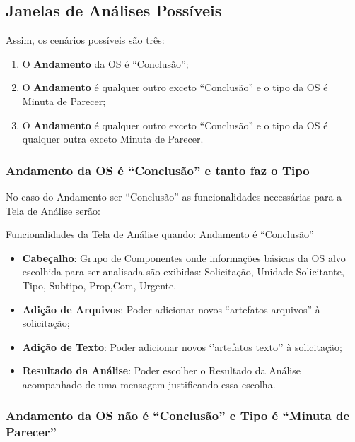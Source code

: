 

\subsection{Janelas de Análises Possíveis}

Assim, os cenários possíveis são três:

\begin{enumerate}
	\item O \textbf{Andamento} da OS é ``Conclusão'';
	\item O \textbf{Andamento} é qualquer outro exceto ``Conclusão'' e o tipo da OS é Minuta de Parecer;	
	\item O \textbf{Andamento} é qualquer outro exceto ``Conclusão'' e o tipo da OS é qualquer outra exceto Minuta de Parecer.		
\end{enumerate}


\subsubsection{Andamento da OS é ``Conclusão'' e tanto faz o Tipo}

No caso do Andamento ser ``Conclusão'' as funcionalidades necessárias para a Tela de Análise serão:

\begin{nota}[1]{Funcionalidades da Tela de Análise quando: Andamento é ``Conclusão''}
	\begin{itemize}
		\item \textbf{Cabeçalho}: Grupo de Componentes onde informações básicas da OS alvo escolhida para ser analisada são exibidas: Solicitação, Unidade Solicitante, Tipo, Subtipo, Prop,Com, Urgente.
		\item \textbf{Adição de Arquivos}: Poder adicionar novos ``artefatos arquivos'' à solicitação;
		\item \textbf{Adição de Texto}: Poder adicionar novos `'artefatos texto'' à solicitação;
		\item \textbf{Resultado da Análise}: Poder escolher o Resultado da Análise acompanhado de uma mensagem justificando essa escolha.		
	\end{itemize}
\end{nota}


\subsubsection{Andamento da OS não é ``Conclusão'' e Tipo é ``Minuta de Parecer''}

